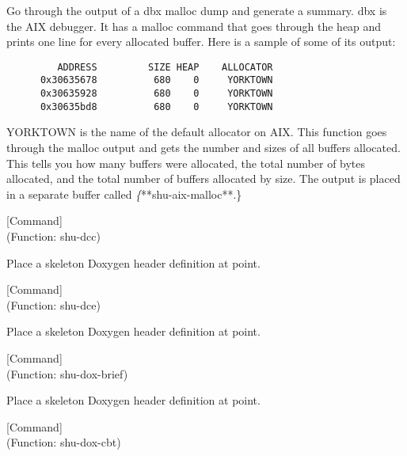 \begin{doc-string}
Go through the output of a dbx malloc dump and generate a summary.  dbx is
the AIX debugger.  It has a malloc command that goes through the heap and prints
one line for every allocated buffer.  Here is a sample of some of its output:

\small{\begin{verbatim}
         ADDRESS         SIZE HEAP    ALLOCATOR
      0x30635678          680    0     YORKTOWN
      0x30635928          680    0     YORKTOWN
      0x30635bd8          680    0     YORKTOWN
\end{verbatim}}

YORKTOWN is the name of the default allocator on AIX.  This function goes
through the malloc output and gets the number and sizes of all buffers
allocated.  This tells you how many buffers were allocated, the total number of
bytes allocated, and the total number of buffers allocated by size.  The output
is placed in a separate buffer called \emph\{**shu-aix-malloc**.\}
\end{doc-string}

\vspace{1em}
\noindent
{}
\usebox{\funcname}
 \hfill [Command]\\%
 (Function: shu-dcc)

\begin{doc-string}
Place a skeleton Doxygen header definition at point.
\end{doc-string}

\vspace{1em}
\noindent
{}
\usebox{\funcname}
 \hfill [Command]\\%
 (Function: shu-dce)

\begin{doc-string}
Place a skeleton Doxygen header definition at point.
\end{doc-string}

\vspace{1em}
\noindent
{}
\usebox{\funcname}
 \hfill [Command]\\%
 (Function: shu-dox-brief)

\begin{doc-string}
Place a skeleton Doxygen header definition at point.
\end{doc-string}

\vspace{1em}
\noindent
{}
\usebox{\funcname}
 \hfill [Command]\\%
 (Function: shu-dox-cbt)

